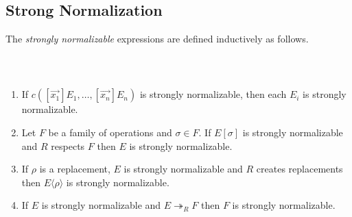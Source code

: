 
\subsection{Strong Normalization}

The \emph{strongly normalizable} expressions are defined inductively as follows.

\begin{code}%
\>  \AgdaSymbol{\{}  \AgdaSymbol{\}} \AgdaSymbol{:}       \<%
\\
\>[0]\<[2]%
\>[2] \AgdaSymbol{:}            \AgdaSymbol{)}   \<%
\end{code}

\begin{lemma}$ $
\begin{enumerate}
\item
If $c([\vec{x_1}]E_1, \ldots, [\vec{x_n}]E_n)$ is strongly normalizable, then each $E_i$ is strongly normalizable.
\item
Let $F$ be a family of operations and $\sigma \in F$.
If $E[\sigma]$ is strongly normalizable and $R$ respects $F$ then $E$ is strongly normalizable.
\item
If $\rho$ is a replacement, $E$ is strongly normalizable and $R$ creates replacements then $E \langle \rho \rangle$ is strongly normalizable.
\item
If $E$ is strongly normalizable and $E \twoheadrightarrow_R F$ then $F$ is strongly normalizable.
\end{enumerate}
\end{lemma}

